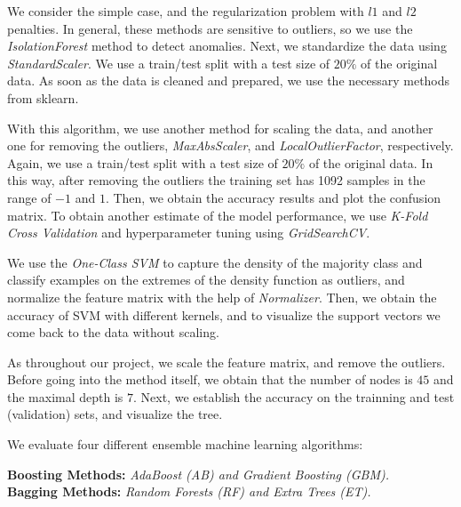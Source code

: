\documentclass[a4paper,11pt]{amsart}
\begin{document}
\medbreak

 We consider the simple case, and the regularization problem with $l1$ and $l2$ penalties. In general, these methods are sensitive to outliers, so we use the \emph{IsolationForest} method to detect anomalies. Next, we standardize the data using \emph{StandardScaler}. We use a train/test split with a test size of $20\%$ of the original data.  As soon as the data is cleaned and prepared, we use the necessary methods from sklearn.

\medbreak

 With this algorithm, we use another method for scaling the data, and another one for removing the outliers, \emph{MaxAbsScaler}, and \emph{LocalOutlierFactor}, respectively. Again, we use a train/test split with a test size of $20\%$ of the original data. In this way, after removing the outliers the training set has 1092 samples in the range of $-1$ and $1$. Then, we obtain the accuracy results and plot the confusion matrix. To obtain another estimate of the model performance, we use \emph{K-Fold Cross Validation} and hyperparameter tuning using \emph{GridSearchCV}.

\medbreak

 We use the \emph{One-Class SVM} to capture the density of the majority class and classify examples on the extremes of the density function as outliers, and normalize the feature matrix with the help of \emph{Normalizer}. Then, we obtain the accuracy of SVM with different kernels, and to visualize the support vectors we come back to the data without scaling.

\medbreak

 As throughout our project, we scale the feature matrix, and remove the outliers. Before going into the method itself, we obtain that the number of nodes is $45$ and the maximal depth is $7$. Next, we establish the accuracy on the trainning and test (validation) sets, and visualize the tree.

\medbreak

 We evaluate four different ensemble machine learning algorithms:
\begin{flushleft}
\textbf{Boosting Methods:} \emph{AdaBoost (AB) and Gradient Boosting (GBM).}\\
\textbf{Bagging Methods:} \emph{Random Forests (RF) and Extra Trees (ET).}
\end{flushleft}
\end{document}
